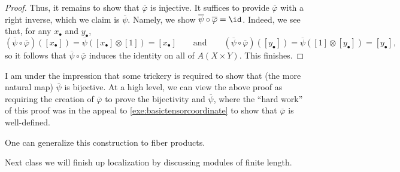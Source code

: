 \begin{proof}
	Thus, it remains to show that $\overline\varphi$ is injective. It suffices to provide $\overline\varphi$ with a right inverse, which we claim is $\overline\psi$. Namely, we show $\overline\psi\circ\overline\varphi=\id$. Indeed, we see that, for any $x_\bullet$ and $y_\bullet$,
	\[(\overline\psi\circ\overline\varphi)([x_\bullet])=\overline\psi([x_\bullet]\otimes[1])=[x_\bullet]\qquad\text{and}\qquad(\overline\psi\circ\overline\varphi)([y_\bullet])=\overline\psi([1]\otimes[y_\bullet])=[y_\bullet],\]
	so it follows that $\overline\psi\circ\overline\varphi$ induces the identity on all of $A(X\times Y)$. This finishes.
\end{proof}
\begin{remark}[Nir]
	I am under the impression that some trickery is required to show that (the more natural map) $\overline\psi$ is bijective. At a high level, we can view the above proof as requiring the creation of $\overline\varphi$ to prove the bijectivity and $\overline\psi$, where the ``hard work'' of this proof was in the appeal to \autoref{exe:basictensorcoordinate} to show that $\overline\varphi$ is well-defined.
\end{remark}
\begin{remark}
	One can generalize this construction to fiber products.
\end{remark}
Next class we will finish up localization by discussing modules of finite length.